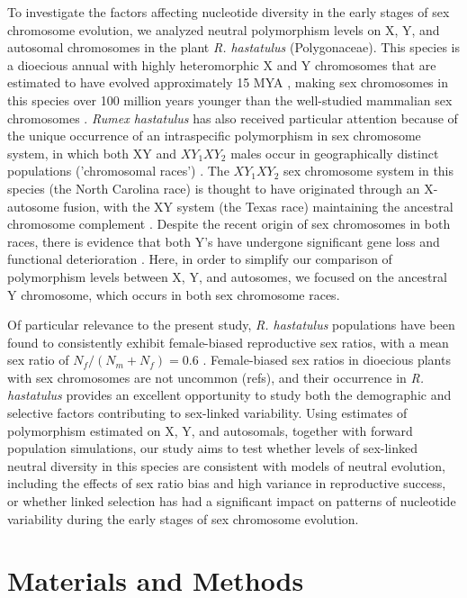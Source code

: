 \documentclass[9pt,twocolumn,twoside]{gsajnl}
\begin{document}
To investigate the factors affecting nucleotide diversity in the early stages of sex chromosome evolution, we analyzed neutral polymorphism levels on X, Y, and autosomal chromosomes in the plant \textit{R. hastatulus }(Polygonaceae). This species is a dioecious annual with highly heteromorphic X and Y chromosomes that are estimated to have evolved  approximately 15 MYA \citep{quesada2011,grabowska2015,navajas2005}, making sex chromosomes in this species over 100 million years younger than the well-studied mammalian sex chromosomes \citep{lahn1999,ross2005dna}. \textit{Rumex hastatulus} has also received particular attention because of the unique occurrence of an intraspecific polymorphism in sex chromosome system, in which both XY and $XY_{1}XY_{2}$ males occur in geographically distinct populations ('chromosomal races') \citep{smith1963mechanism}. The $XY_{1}XY_{2}$ sex chromosome system in this species (the North Carolina race) is thought to have originated through an X-autosome fusion, with the XY system (the Texas race) maintaining the ancestral chromosome complement \citep{smith1964evolving}. Despite the recent origin of sex chromosomes in both races, there is evidence that both Y's have undergone significant gene loss and functional deterioration \citep{hough2014}. Here, in order to simplify our comparison of polymorphism levels between X, Y, and autosomes, we focused on the ancestral Y chromosome, which occurs in both sex chromosome races.

Of particular relevance to the present study, \textit{R. hastatulus} populations have been found to consistently exhibit female-biased reproductive sex ratios, with a mean sex ratio of $N_{f}/(N_{m}+N_{f})=0.6$ \citep{pickup2013influence}. Female-biased sex ratios in dioecious plants with sex chromosomes are not uncommon (refs), and their occurrence in \textit{R. hastatulus} provides an excellent opportunity to study both the demographic and selective factors contributing to sex-linked variability. Using estimates of polymorphism estimated on X, Y, and autosomals, together with forward population simulations, our study aims to test whether levels of sex-linked neutral diversity in this species are consistent with models of neutral evolution, including the effects of sex ratio bias and high variance in reproductive success, or whether linked selection has had a significant impact on patterns of nucleotide variability during the early stages of sex chromosome evolution.

\section*{Materials and Methods}
\end{document}
